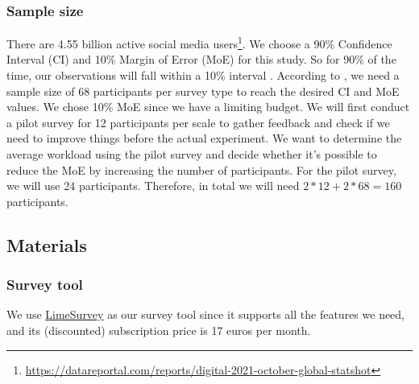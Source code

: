 \documentclass[a4paper]{article}
\begin{document}
\subsubsection{Sample size}
There are 4.55 billion active social media users\footnote{\url{https://datareportal.com/reports/digital-2021-october-global-statshot}}. We choose a 90\% Confidence Interval (CI) and 10\% Margin of Error (MoE) for this study. So for 90\% of the time, our observations will fall within a 10\% interval \cite{olson2014ways}. According to \cite{olson2014ways}, we need a sample size of 68 participants per survey type to reach the desired CI and MoE values. We chose 10\% MoE since we have a limiting budget. We will first conduct a pilot survey for 12 participants per scale to gather feedback and check if we need to improve things before the actual experiment. We want to determine the average workload using the pilot survey and decide whether it's possible to reduce the MoE by increasing the number of participants. For the pilot survey, we will use 24 participants. Therefore, in total we will need $2*12+2*68 = 160$ participants.

\subsection{Materials}
\subsubsection{Survey tool}
We use \href{https://www.limesurvey.org}{LimeSurvey} as our survey tool since it supports all the features we need, and its (discounted) subscription price is 17 euros per month.
\end{document}
